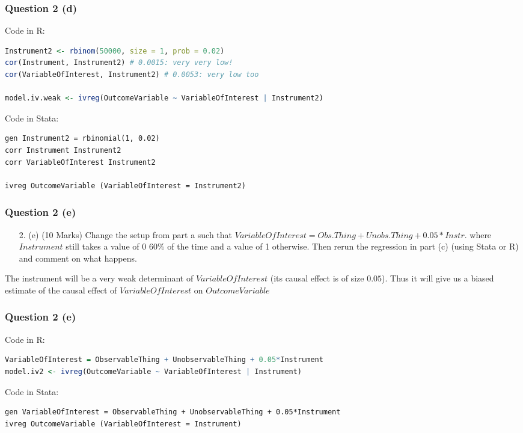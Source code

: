 \documentclass[xcolor=table,dvipsnames]{beamer}
\begin{document}
\begin{frame}[fragile]
\frametitle{Question 2 (d)}
Code in R:
\begin{lstlisting}[language=R]
Instrument2 <- rbinom(50000, size = 1, prob = 0.02)
cor(Instrument, Instrument2) # 0.0015: very very low!
cor(VariableOfInterest, Instrument2) # 0.0053: very low too

model.iv.weak <- ivreg(OutcomeVariable ~ VariableOfInterest | Instrument2)
\end{lstlisting} \pause

Code in Stata:
\begin{lstlisting}
gen Instrument2 = rbinomial(1, 0.02)
corr Instrument Instrument2
corr VariableOfInterest Instrument2

ivreg OutcomeVariable (VariableOfInterest = Instrument2)
\end{lstlisting}
\end{frame}

\begin{frame}
\frametitle{Question 2 (e)}
\begin{enumerate}
\item[2.](e) (10 Marks) Change the setup from part a such that $VariableOfInterest = Obs.Thing + Unobs.Thing + 0.05*Instr.$ where $Instrument$ still takes a value of 0 60\% of the time and a value of 1 otherwise. Then rerun the regression in part (c) (using Stata or R) and comment on what happens.
\end{enumerate}\pause

The instrument will be a very weak determinant of $VariableOfInterest$ (its causal effect is of size $0.05$). \pause Thus it will give us a biased estimate of the causal effect of $VariableOfInterest$ on $OutcomeVariable$
\end{frame}

\begin{frame}[fragile]
\frametitle{Question 2 (e)}
Code in R:
\begin{lstlisting}[language=R]
VariableOfInterest = ObservableThing + UnobservableThing + 0.05*Instrument
model.iv2 <- ivreg(OutcomeVariable ~ VariableOfInterest | Instrument)
\end{lstlisting} \pause

Code in Stata:
\begin{lstlisting}
gen VariableOfInterest = ObservableThing + UnobservableThing + 0.05*Instrument
ivreg OutcomeVariable (VariableOfInterest = Instrument)
\end{lstlisting}
\end{frame}
\end{document}
